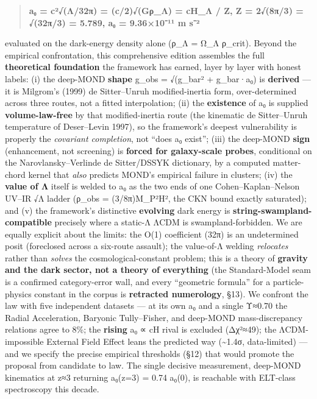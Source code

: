 \documentclass[
]{article}
\begin{document}
\begin{quote}
\textbf{a₀ = c²√(Λ/32π) = (c/2)√(Gρ\_Λ) = cH\_Λ / Z, Z = 2√(8π/3) =
√(32π/3) = 5.789, a₀ = 9.36×10⁻¹¹ m s⁻²}
\end{quote}

evaluated on the dark-energy density alone (ρ\_Λ = Ω\_Λ ρ\_crit). Beyond
the empirical confrontation, this comprehensive edition assembles the
full \textbf{theoretical foundation} the framework has earned, layer by
layer with honest labels: (i) the deep-MOND \textbf{shape} g\_obs =
√(g\_bar² + g\_bar·a₀) is \textbf{derived} --- it is Milgrom's (1999) de
Sitter--Unruh modified-inertia form, over-determined across three
routes, not a fitted interpolation; (ii) the \textbf{existence} of a₀ is
supplied \textbf{volume-law-free} by that modified-inertia route (the
kinematic de Sitter--Unruh temperature of Deser--Levin 1997), so the
framework's deepest vulnerability is properly the \emph{covariant
completion}, not ``does a₀ exist''; (iii) the deep-MOND \textbf{sign}
(enhancement, not screening) is \textbf{forced for galaxy-scale probes},
conditional on the Narovlansky--Verlinde de Sitter/DSSYK dictionary, by
a computed matter-chord kernel that \emph{also} predicts MOND's
empirical failure in clusters; (iv) the \textbf{value of Λ} itself is
welded to a₀ as the two ends of one Cohen--Kaplan--Nelson UV--IR √Λ
ladder (ρ\_obs = (3/8π)M\_P²H², the CKN bound exactly saturated); and
(v) the framework's distinctive \textbf{evolving} dark energy is
\textbf{string-swampland-compatible} precisely where a static-Λ ΛCDM is
swampland-forbidden. We are equally explicit about the limits: the O(1)
coefficient (32π) is an undetermined posit (foreclosed across a
six-route assault); the value-of-Λ welding \emph{relocates} rather than
\emph{solves} the cosmological-constant problem; this is a theory of
\textbf{gravity and the dark sector, not a theory of everything} (the
Standard-Model seam is a confirmed category-error wall, and every
``geometric formula'' for a particle-physics constant in the corpus is
\textbf{retracted numerology}, §13). We confront the law with five
independent datasets --- at its own a₀ and a single Υ≈0.70 the Radial
Acceleration, Baryonic Tully--Fisher, and deep-MOND mass-discrepancy
relations agree to 8\%; the \textbf{rising} a₀ ∝ cH rival is excluded
(Δχ²≈49); the ΛCDM-impossible External Field Effect leans the predicted
way (\textasciitilde1.4σ, data-limited) --- and we specify the precise
empirical thresholds (§12) that would promote the proposal from
candidate to law. The single decisive measurement, deep-MOND kinematics
at z≈3 returning a₀(z=3) = 0.74 a₀(0), is reachable with ELT-class
spectroscopy this decade.
\end{document}
